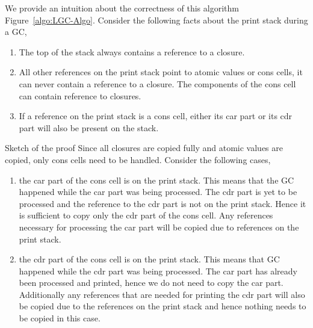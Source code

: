 \documentclass[9pt]{sigplanconf}
\begin{document}
\begin{enumerate}
We   provide   an   intuition    about   the   correctness   of   this
algorithm Figure~\ref{algo:LGC-Algo}. Consider the following facts
about the print stack during a
GC,

\begin{enumerate}
\item The top of the stack always contains a reference to a closure.
\item All other references on the print stack point to atomic values or
cons cells, it can never contain a
reference to a closure. The components of the cons cell can contain
reference to closures.
\item If a reference on the print stack is a cons cell, either its car
part or its cdr part will also be
present on the stack.
\end{enumerate}
Sketch of the proof
Since all closures are copied fully and atomic values are copied, only
cons cells need to be handled.
Consider the following cases,
\begin{enumerate}
\item the car part of the cons  cell is on the print stack. This means
  that the GC happened while the car part was being processed. The cdr
  part is yet to be processed and the reference to the cdr part is not
  on the print stack. Hence it is sufficient to copy only the cdr part
  of the  cons cell. Any  references necessary for processing  the car
  part will be copied due to references on the print stack.
\item the cdr part of the cons  cell is on the print stack. This means
  that GC  happened while the cdr  part was being  processed.  The car
  part has already been processed and printed, hence we do not need to
  copy the car  part. Additionally any references that  are needed for
  printing the cdr  part will also be copied due  to the references on
  the print stack and hence nothing needs to be copied in this case.

\end{enumerate}
\end{enumerate}
\end{document}
